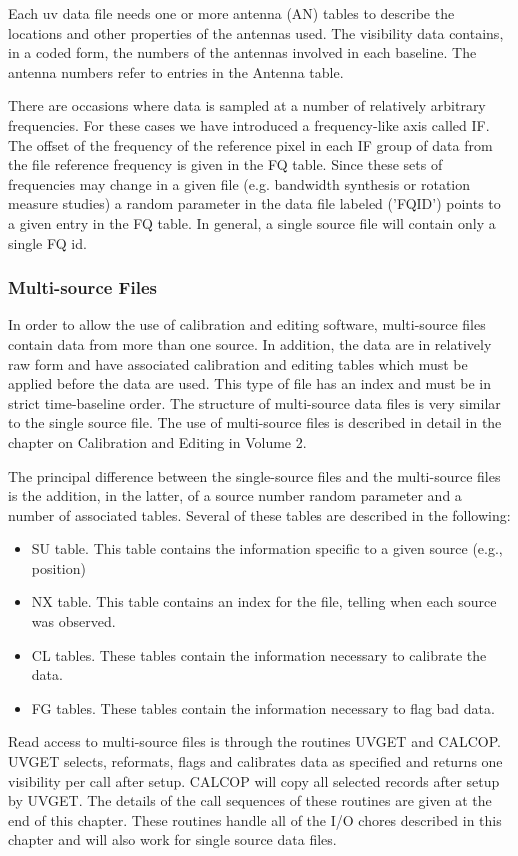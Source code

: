 Each uv data file needs one or more antenna (AN) tables to describe
the locations and other properties of the antennas used.  The
visibility data contains, in a coded form, the numbers of the antennas
involved in each baseline.  The antenna numbers refer to entries in
the Antenna table.

There are occasions where data is sampled at a number of relatively
arbitrary frequencies.  For these cases we have introduced a
frequency-like axis called IF.  The offset of the frequency of the
reference pixel in each IF group of data from the file reference
frequency is given in the FQ table.  Since these sets of frequencies
may change in a given file (e.g. bandwidth synthesis or rotation
measure studies) a random parameter in the data file labeled ('FQID')
points to a given entry in the FQ table.  In general, a single source
file will contain only a single FQ id.

\subsubsection{Multi-source Files}
In order to allow the use of calibration and editing software,
multi-source files contain data from more than one source.  In
addition, the data are in relatively raw form and have associated
calibration and editing tables which must be applied before the data
are used.  This type of file has an index and must be in strict
time-baseline order.  The structure of multi-source data files is very
similar to the single source file. The use of multi-source files is
described in detail in the chapter on Calibration and Editing in
Volume 2.

The principal difference between the single-source files and the
multi-source files is the addition, in the latter, of a source number
random parameter and a number of associated tables. Several of these
tables are described in the following:

\begin{itemize} %
\item SU table.   This table contains the information specific to a given
source (e.g., position)
\item NX table.   This table contains an index for the file, telling when
each source was observed.
\item CL tables.  These tables contain the information necessary to
calibrate the data.
\item FG tables.  These tables contain the information necessary to flag bad
data.

\end{itemize} %
Read access to multi-source files is through the routines UVGET and
CALCOP.  UVGET selects, reformats, flags and calibrates data as
specified and returns one visibility per call after setup.  CALCOP
will copy all selected records after setup by UVGET.  The details of
the call sequences of these routines are given at the end of this
chapter.  These routines handle all of the I/O chores described in
this chapter and will also work for single source data files.

